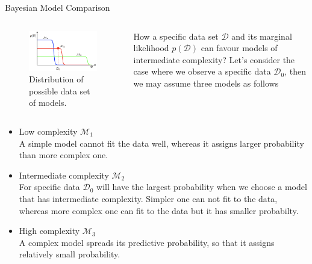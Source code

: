 \documentclass{bredelebeamer}
\begin{document}
\begin{frame}{Bayesian Model Comparison}
  \begin{columns}
    \begin{column}{0.5\textwidth}
      \begin{figure}
      \centering
      \includegraphics[scale=0.3]{bayesian_model_comparison.png}
      \caption{
        Distribution of possible data set of models.
      }
      \end{figure}
    \end{column}
    \begin{column}{0.5\textwidth}
      \begin{justify}
      How a specific data set $\mathcal{D}$ and its marginal likelihood $p(\mathcal{D})$
      can favour models of intermediate complexity?
      Let's consider the case where we observe a specific data $\mathcal{D}_0$,
      then we may assume three models as follows
      \end{justify}
    \end{column}
  \end{columns}
  \begin{itemize}
    \item Low complexity $\mathcal{M}_1$ \\
          A simple model cannot fit the data well, whereas it assigns larger
          probability than more complex one.
    \item Intermediate complexity $\mathcal{M}_2$ \\
          For specific data $\mathcal{D}_0$ will have the largest probability
          when we choose a model that has intermediate complexity. Simpler one
          can not fit to the data, whereas more complex one can fit to the data
          but it has smaller probabilty.
    \item High complexity $\mathcal{M}_3$ \\
          A complex model spreads its predictive probability, so that it assigns
          relatively small probability.
  \end{itemize}
\end{frame}
\end{document}
